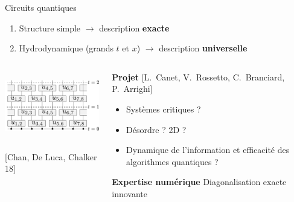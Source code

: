 \begin{frame}{Circuits quantiques}
\begin{enumerate}
	\item Structure simple $\to$ description \textbf{exacte}
	\item Hydrodynamique (grands $t$ et $x$) $\to$ description \textbf{universelle}
\end{enumerate}
\begin{columns}
	\begin{column}{0.5\textwidth}
		\centering
		\includegraphics[height=3cm]{img/2_projet_recherche/circuit}
				
		\footnotesize{[Chan, De Luca, Chalker 18]}
	\end{column}
	\begin{column}{0.6\textwidth}
		\begin{block}{\textbf{Projet} \footnotesize{[L.\ Canet, V.\ Rossetto, C.\ Branciard, P.\ Arrighi]}}
			\begin{itemize}
				\item Systèmes critiques ?
				\item Désordre ? 2D ?
				\item Dynamique de l'information et efficacité des algorithmes quantiques ?
			\end{itemize}
		\end{block}
		\begin{block}{\textbf{Expertise numérique}}
			Diagonalisation exacte innovante
		\end{block}
	\end{column}
\end{columns}
\end{frame}
